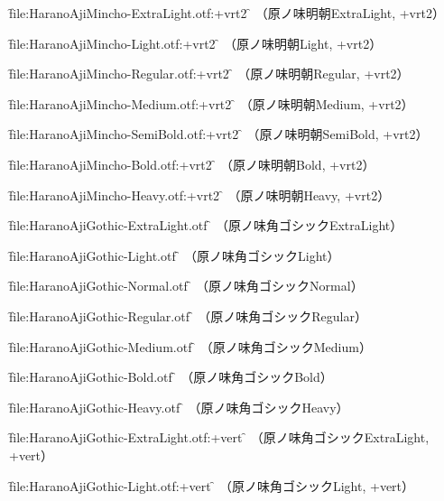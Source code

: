 \font\f{file:HaranoAjiMincho-ExtraLight.otf:+vrt2} \f
\testAll
（原ノ味明朝ExtraLight, +vrt2）\par

\font\f{file:HaranoAjiMincho-Light.otf:+vrt2} \f
\testAll
（原ノ味明朝Light, +vrt2）\par

\font\f{file:HaranoAjiMincho-Regular.otf:+vrt2} \f
\testAll
（原ノ味明朝Regular, +vrt2）\par

\font\f{file:HaranoAjiMincho-Medium.otf:+vrt2} \f
\testAll
（原ノ味明朝Medium, +vrt2）\par

\font\f{file:HaranoAjiMincho-SemiBold.otf:+vrt2} \f
\testAll
（原ノ味明朝SemiBold, +vrt2）\par

\font\f{file:HaranoAjiMincho-Bold.otf:+vrt2} \f
\testAll
（原ノ味明朝Bold, +vrt2）\par

\font\f{file:HaranoAjiMincho-Heavy.otf:+vrt2} \f
\testAll
（原ノ味明朝Heavy, +vrt2）\par



\font\f{file:HaranoAjiGothic-ExtraLight.otf} \f
\testAll
（原ノ味角ゴシックExtraLight）\par

\font\f{file:HaranoAjiGothic-Light.otf} \f
\testAll
（原ノ味角ゴシックLight）\par

\font\f{file:HaranoAjiGothic-Normal.otf} \f
\testAll
（原ノ味角ゴシックNormal）\par

\font\f{file:HaranoAjiGothic-Regular.otf} \f
\testAll
（原ノ味角ゴシックRegular）\par

\font\f{file:HaranoAjiGothic-Medium.otf} \f
\testAll
（原ノ味角ゴシックMedium）\par

\font\f{file:HaranoAjiGothic-Bold.otf} \f
\testAll
（原ノ味角ゴシックBold）\par

\font\f{file:HaranoAjiGothic-Heavy.otf} \f
\testAll
（原ノ味角ゴシックHeavy）\par


\font\f{file:HaranoAjiGothic-ExtraLight.otf:+vert} \f
\testAll
（原ノ味角ゴシックExtraLight, +vert）\par

\font\f{file:HaranoAjiGothic-Light.otf:+vert} \f
\testAll
（原ノ味角ゴシックLight, +vert）\par


